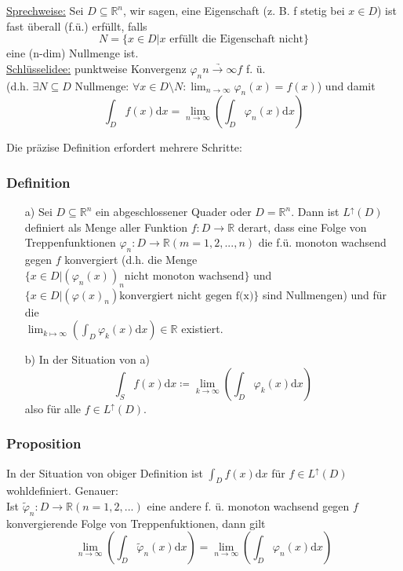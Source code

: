 \underline{Sprechweise:} Sei $D \subseteq \mathbb{R}^n$, wir sagen, eine Eigenschaft (z. B. f stetig bei $x \in D$) ist fast überall (f.ü.) erfüllt, falls
\[N=\{x \in D | x \text{ erfüllt die Eigenschaft nicht}\}\]
eine (n-dim) Nullmenge ist.\\

\underline{Schlüsselidee:} punktweise Konvergenz $\varphi_n \underrightarrow{n \to \infty} f$ f. ü.\\
	(d.h. $\exists N \subseteq D \text{ Nullmenge: } \forall x \in D \setminus N \colon \lim_{n \to \infty} \varphi_n(x)=f(x)$) und damit
	\[\int_D f(x) \text{d}x = \lim_{n \to \infty} \left(\int_D \varphi_n(x) \text{d}x\right)\]

Die präzise Definition erfordert mehrere Schritte:

\subsubsection{Definition}
\begin{itemize}
	\item[a)] Sei $D \subseteq \mathbb{R}^n$ ein abgeschlossener Quader oder $D = \mathbb{R}^n$. Dann ist $L^\uparrow(D)$ definiert als Menge aller Funktion $f \colon D \to \mathbb{R}$ derart, dass eine Folge von Treppenfunktionen $\varphi_n \colon D \to \mathbb{R} (m=1,2,...,n)$ die f.ü. monoton wachsend gegen $f$ konvergiert (d.h. die Menge $\{x \in D | (\varphi_n(x))_n \text{nicht monoton wachsend}\}$ und $\{x \in D | (\varphi(x)_n) \text{konvergiert nicht gegen f(x)}\}$ sind Nullmengen) und für die\\
	$\lim_{k \mapsto \infty} (\int_D \varphi_k(x) \text{d}x) \in \mathbb{R}$ existiert.
	\item[b)]  In der Situation von a)
		\[\int_S f(x) \text{d}x \coloneqq \lim_{k \to \infty} \left(\int_D \varphi_k(x) \text{d}x \right)\] 
		also für alle $f \in L^\uparrow(D)$.
\end{itemize}

\subsubsection{Proposition}
In der Situation von obiger Definition ist $\int_D f(x) \text{d}x$ für $f\in L^\uparrow(D)$ wohldefiniert. Genauer:\\
Ist $\tilde{\varphi}_n \colon D \to \mathbb{R} (n=1,2,...)$ eine andere f. ü. monoton wachsend gegen $f$ konvergierende Folge von Treppenfuktionen, dann gilt
\[\lim_{n \to \infty} \left(\int_D \tilde{\varphi}_n (x) \text{d}x\right) = \lim_{n \to \infty} \left(\int_D \varphi_n(x) \text{d}x\right)\]

